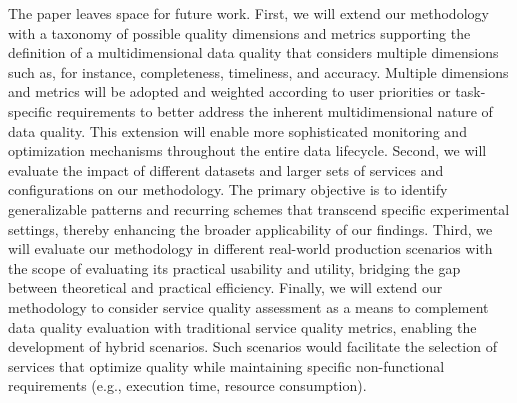 \documentclass[sn-mathphys-num,referee]{sn-jnl}
\theoremstyle{definition}
\begin{document}
{\color{OurColor}
The paper leaves space for future work. First, we will extend our methodology with a taxonomy of possible quality dimensions and metrics supporting the definition of a multidimensional data quality that considers multiple dimensions such as, for instance, completeness, timeliness, and accuracy. Multiple dimensions and metrics will be adopted and weighted according to user priorities or task-specific requirements to better address the inherent multidimensional nature of data quality. This extension will enable more sophisticated monitoring and optimization mechanisms throughout the entire data lifecycle. Second, we will evaluate the impact of different datasets and larger sets of services and configurations on our methodology. The primary objective is to identify generalizable patterns and recurring schemes that transcend specific experimental settings, thereby enhancing the broader applicability of our findings. Third, we will evaluate our methodology in different real-world production scenarios with the scope of evaluating its practical usability and utility, bridging the gap between theoretical and practical efficiency. Finally, we will extend our methodology to consider service quality assessment as a means to complement data quality evaluation with traditional service quality metrics, enabling the development of hybrid scenarios. Such scenarios would facilitate the selection of services that optimize quality while maintaining specific non-functional requirements (e.g., execution time, resource consumption).
}



\clearpage
\end{document}
